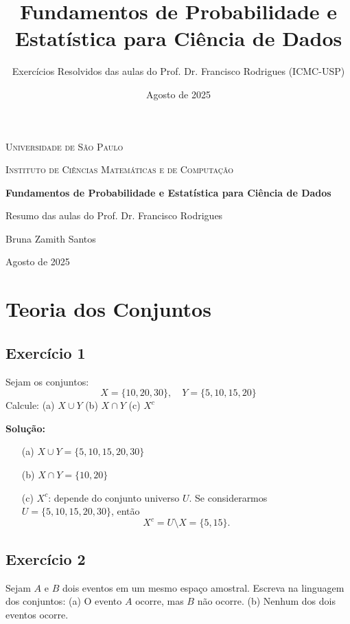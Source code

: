 \documentclass{article}
\title{Fundamentos de Probabilidade e Estatística para Ciência de Dados}
\author{Exercícios Resolvidos das aulas do Prof. Dr. Francisco Rodrigues (ICMC-USP)}
\date{Agosto de 2025}
\begin{document}
\begin{titlepage}
    \centering
    \vspace*{3cm}
    {\scshape\LARGE Universidade de São Paulo \par}
    \vspace{1cm}
    {\scshape\Large Instituto de Ciências Matemáticas e de Computação\par}
    \vspace{2.5cm}
    {\huge\bfseries Fundamentos de Probabilidade e Estatística para Ciência de Dados\par}
    \vspace{1cm}
    {\Large Resumo das aulas do Prof. Dr. Francisco Rodrigues\par}
    \vfill
    {\Large Bruna Zamith Santos\par}
    \vspace{0.5cm}
    {\large Agosto de 2025\par}
\end{titlepage}

\tableofcontents
\newpage

\section{Teoria dos Conjuntos}
\subsection{Exercício 1}
Sejam os conjuntos:
$$X = \{10, 20, 30\}, \quad Y = \{5, 10, 15, 20\}$$
Calcule:  
(a) $X \cup Y$
(b) $X \cap Y$  
(c) $X^c$

\vspace{0.5cm}
\textbf{Solução:}
\begin{itemize}
    \item[(a)] $X \cup Y = \{5, 10, 15, 20, 30\}$
    \item[(b)] $X \cap Y = \{10, 20\}$
    \item[(c)] $X^c$: depende do conjunto universo $U$.  
          Se considerarmos $U = \{5, 10, 15, 20, 30\}$, então  
          $$X^c = U \setminus X = \{5, 15\}.$$
\end{itemize}

\subsection{Exercício 2}
Sejam $A$ e $B$ dois eventos em um mesmo espaço amostral.  
Escreva na linguagem dos conjuntos:
(a) O evento $A$ ocorre, mas $B$ não ocorre.
(b) Nenhum dos dois eventos ocorre.  
\end{document}
